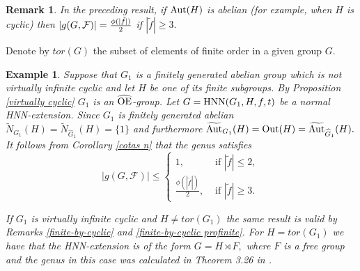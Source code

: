 \documentclass[a4paper,12pt]{article}
\newcommand{\Oe}{\rm \widehat{OE}}
\newcommand{\F}{{\cal F}}
\def\aut {{\rm Aut}}
\def\out {{\rm Out}}
\def\hnn {{\rm HNN}}
\newtheorem{exa}[thm]{Example}
\newtheorem{rem}[thm]{Remark}
\begin{document}
{\begin{rem}\label{H subgroup cyclic}
In the preceding result, if $\aut(H)$ is abelian (for example, when $H$ is cyclic) then $|g(G, \F)|=\frac{\phi(|\tilde f|)}{2}$ if $|\tilde f|\geq 3.$      
\end{rem} 

Denote by $tor(G)$ the subset of elements of finite order in a given group $G.$ 

\begin{exa} Suppose that $G_1$ is a finitely generated abelian group which is not virtually infinite cyclic and let $H$ be one of its finite subgroups. By Proposition \ref{virtually cyclic} $G_1$ is an $\Oe$-group. Let $G=\hnn(G_1,H,f,t)$ be a normal HNN-extension. Since $G_1$ is finitely generated abelian $\widetilde{N}_{G_1}(H)= \widetilde{N}_{\widehat{G }_1}(H)=\{1\}$ and furthermore $\widetilde{\aut}_{ G_1}(H)=\out(H)=\widetilde{\aut}_{\widehat{G}_1}(H).$ It follows from Corollary \ref{cotas n} that the genus satisfies %
$$|g(G, \mathcal{F})|\leq \left\{\begin{array}{cc}
  1,&\mbox{ if } |\tilde f| \leq 2,\\
\displaystyle\frac{\phi(|\tilde f|)}{2}, &\mbox{ if } |\tilde f| \geq 3.
\end{array}\right.$$ 

If $G_1$ is virtually infinite cyclic and $H \neq tor(G_1)$ the same result is valid by Remarks \ref{finite-by-cyclic} and \ref{finite-by-cyclic profinite}.  
For $H=tor(G_1)$ we have that the HNN-extension is of the form $G=H \rtimes F,$ where $F$ is a free group and the genus in this case was calculated in Theorem 3.26 in \cite{GZ}. 
\end{exa}

}
\end{document}
